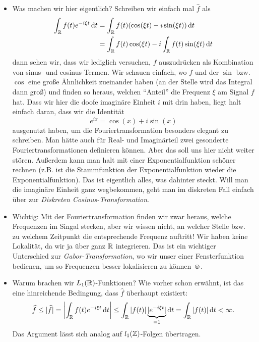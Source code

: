 \begin{remark}\leavevmode
\begin{itemize}
\item Was machen wir hier eigentlich? Schreiben wir einfach mal $ \widehat{f} $ als
\begin{align*}
   \int_{\R} f(t) e^{-i\xi t} \dif t
&= \int_{\R} f(t) (\cos(\xi t) - i\sin(\xi t)) \dif t \\
&= \int_{\R} f(t) \cos(\xi t) - i \int_{\R} f(t) \sin(\xi t) \dif t
\end{align*}
dann sehen wir, dass wir lediglich versuchen, $ f $ auszudrücken als Kombination von sinus- und
cosinus-Termen. Wir schauen einfach, wo $ f $ und der $ \sin $ bzw. $ \cos $ eine große Ähnlichkeit
zueinander haben (an der Stelle wird das Integral dann groß) und finden so heraus, welchen 
\enquote{Anteil} die Frequenz $ \xi $ am Signal $ f $ hat. Dass wir hier die doofe imaginäre 
Einheit $ i $ mit drin haben, liegt halt einfach daran, dass wir die Identität
\[
  e^{ix} = \cos(x) + i \sin(x)
\]
ausgenutzt haben, um die Fouriertransformation besonders elegant zu schreiben. Man hätte auch für
Real- und Imaginärteil zwei gesonderte Fouriertransformationen definieren können. Aber das soll uns
hier nicht weiter stören. Außerdem kann man halt mit einer Exponentialfunktion schöner rechnen 
(z.B. ist die Stammfunktion der Exponentialfunktion wieder die Exponentialfunktion). Das ist 
eigentlich alles, was dahinter steckt. Will man die imaginäre Einheit ganz wegbekommen, geht man 
im diskreten Fall einfach über zur \emph{Diskreten Cosinus-Transformation}.
\item Wichtig: Mit der Fouriertransformation finden wir zwar heraus, welche Frequenzen im Singal 
stecken,
aber wir wissen nicht, an welcher Stelle bzw. zu welchem Zeitpunkt die entsprechende Frequenz 
auftritt! Wir haben keine Lokalität, da wir ja über ganz $ \mathbb{R} $ integrieren. Das ist ein wichtiger 
Unterschied zur \emph{Gabor-Transformation}, wo wir unser einer Fensterfunktion bedienen, um so 
Frequenzen besser lokalisieren zu können $ \smiley $.
\item Warum brachen wir $ L_{1}(\mathbb{R}) $-Funktionen? Wie vorher schon erwähnt, ist das eine 
hinreichende Bedingung, dass $ \widehat{f} $ überhaupt existiert:
\[
  \widehat{f} \leq |\widehat{f}| = \left| \int_{\R} f(t) e^{-i\xi t} \dif t \right|
  \leq \int_{\R} |f(t)| \underbrace{|e^{-i\xi t}|}_{= 1} \dif t = \int_{\R} |f(t)| \dif t < \infty.
\]
Das Argument lässt sich analog auf $ l_{1}(\mathbb{Z}) $-Folgen übertragen.
\end{itemize}
\end{remark}

